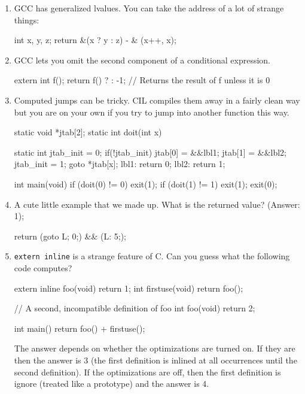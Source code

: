 \documentclass{article}
\def\t#1{{\tt #1}}
\begin{document}
\begin{enumerate}

\item GCC has generalized lvalues. You can take the address of a lot of
strange things:

\begin{cilcode}[local]
  int x, y, z;
  return &(x ? y : z) - & (x++, x);
\end{cilcode}

\item GCC lets you omit the second component of a conditional expression.

\begin{cilcode}[local]
  extern int f();
  return f() ? : -1; // Returns the result of f unless it is 0
\end{cilcode}

\item Computed jumps can be tricky. CIL compiles them away in a fairly clean
way but you are on your own if you try to jump into another function this way.

\begin{cilcode}[global]
static void *jtab[2];
static int doit(int x){
 
  static int jtab_init = 0;
  if(!jtab_init) {
    jtab[0] = &&lbl1;
    jtab[1] = &&lbl2;
    jtab_init = 1;
  }
  goto *jtab[x];
lbl1:
  return 0;
lbl2:
  return 1;
}
 
int main(void){
  if (doit(0) != 0) exit(1);
  if (doit(1) != 1) exit(1);
  exit(0);
}
\end{cilcode}


\item A cute little example that we made up. What is the returned value?
(Answer: 1); 
\begin{cilcode}[local]
 return ({goto L; 0;}) && ({L: 5;});
\end{cilcode}

\item \t{extern inline} is a strange feature of C. Can you guess what the
following code computes? 

\begin{cilcode}[global]
extern inline foo(void) { return 1; }
int firstuse(void) { return foo(); }

// A second, incompatible definition of foo
int foo(void) { return 2; }

int main() {
    return foo() + firstuse();
}
\end{cilcode}

 The answer depends on whether the optimizations are turned on. If they are
then the answer is 3 (the first definition is inlined at all occurrences until
the second definition). If the optimizations are off, then the first
definition is ignore (treated like a prototype) and the answer is 4. 


\end{enumerate}
\end{document}
